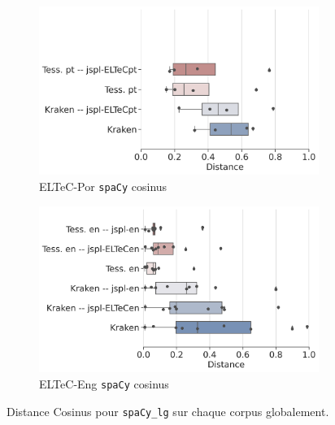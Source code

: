 \begin{figure}[h!]
    \begin{subfigure}{0.5\textwidth}
  \includegraphics[height=.65\textwidth]{IMAGES/Boite-moustache/ELTeC-Por_spaCy3.5.1_cosinus.png} 
        \caption{ELTeC-Por \texttt{spaCy} cosinus} 
         \label{fig:ELTeC-Por-spaCy-cosinus}
   \end{subfigure}
    \begin{subfigure}{0.45\textwidth}
  \includegraphics[height=.65\textwidth]{IMAGES/Boite-moustache/ELTeC-Eng_spacy3.5.1_cosinus.png}
        \caption{ELTeC-Eng \texttt{spaCy} cosinus}
   \end{subfigure}

    \caption{Distance Cosinus pour \texttt{spaCy\_lg} sur chaque corpus globalement.}
\label{fig:Cosinus-spacy-lg}
\end{figure}


